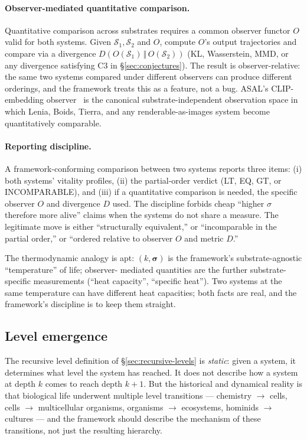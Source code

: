 \documentclass[journal]{IEEEtran}
\theoremstyle{plain}
\theoremstyle{definition}
\theoremstyle{plain}
\begin{document}
\paragraph{Observer-mediated quantitative comparison.} Quantitative
comparison across substrates requires a common observer functor $O$
valid for both systems. Given $\mathcal{S}_1, \mathcal{S}_2$ and $O$,
compute $O$'s output trajectories and compare via a divergence
$D(O(\mathcal{S}_1) \,\Vert\, O(\mathcal{S}_2))$ (KL, Wasserstein, MMD,
or any divergence satisfying C3 in \S\ref{sec:conjectures}). The result
is observer-relative: the same two systems compared under different
observers can produce different orderings, and the framework treats
this as a feature, not a bug. ASAL's CLIP-embedding
observer~\cite{kumar2024asal} is the canonical substrate-independent
observation space in which Lenia, Boids, Tierra, and any
renderable-as-images system become quantitatively comparable.

\paragraph{Reporting discipline.} A framework-conforming comparison
between two systems reports three items: (i) both systems' vitality
profiles, (ii) the partial-order verdict (LT, EQ, GT, or INCOMPARABLE),
and (iii) if a quantitative comparison is needed, the specific
observer $O$ and divergence $D$ used. The discipline forbids cheap
``higher $\sigma$ therefore more alive'' claims when the systems do
not share a measure. The legitimate move is either ``structurally
equivalent,'' or ``incomparable in the partial order,'' or ``ordered
relative to observer $O$ and metric $D$.''

The thermodynamic analogy is apt: $(k, \boldsymbol{\sigma})$ is the
framework's substrate-agnostic ``temperature'' of life; observer-
mediated quantities are the further substrate-specific measurements
(``heat capacity'', ``specific heat''). Two systems at the same
temperature can have different heat capacities; both facts are real,
and the framework's discipline is to keep them straight.

\subsection{Level emergence}\label{sec:le}

The recursive level definition of \S\ref{sec:recursive-levels} is
\emph{static}: given a system, it determines what level the system has
reached. It does not describe how a system at depth $k$ comes to reach
depth $k+1$. But the historical and dynamical reality is that
biological life underwent multiple level transitions --- chemistry
$\to$ cells, cells $\to$ multicellular organisms, organisms $\to$
ecosystems, hominids $\to$ cultures --- and the framework should
describe the mechanism of these transitions, not just the resulting
hierarchy.
\end{document}
